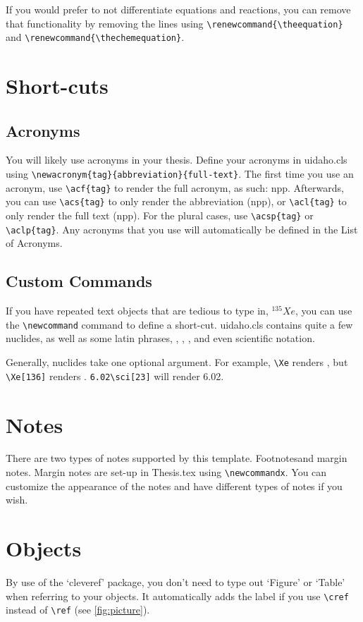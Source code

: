 If you would prefer to not differentiate equations and reactions, you can remove that functionality by removing the lines using \verb|\renewcommand{\theequation}| and \verb|\renewcommand{\thechemequation}|.

\section{Short-cuts}
\subsection{Acronyms}
You will likely use acronyms in your thesis. Define your acronyms in uidaho.cls using \verb|\newacronym{tag}{abbreviation}{full-text}|. The first time you use an acronym, use \verb|\acf{tag}| to render the full acronym, as such: \acf{npp}. Afterwards, you can use \verb|\acs{tag}| to only render the abbreviation (\acs{npp}), or \verb|\acl{tag}| to only render the full text (\acl{npp}). For the plural cases, use \verb|\acsp{tag}| or \verb|\aclp{tag}|. Any acronyms that you use will automatically be defined in the List of Acronyms. 

\subsection{Custom Commands}
If you have repeated text objects that are tedious to type in, \eg $^{135}Xe$, you can use the \verb|\newcommand| command to define a short-cut. uidaho.cls contains quite a few nuclides, as well as some latin phrases, \eg, \ie, \etal, and even scientific notation.

Generally, nuclides take one optional argument. For example, \verb|\Xe| renders \Xe, but \verb|\Xe[136]| renders \Xe[136]. \verb|6.02\sci[23]| will render 6.02\sci[23].

\section{Notes}
There are two types of notes supported by this template. Footnotes\footnotemark and margin notes. Margin notes are set-up in Thesis.tex using \verb|\newcommandx|. You can customize the appearance of the notes and have different types of notes if you wish.



\section{Objects}
By use of the `cleveref' package, you don't need to type out `Figure' or `Table' when referring to your objects. It automatically adds the label if you use \verb|\cref| instead of \verb|\ref| (see \cref{fig:picture}).

